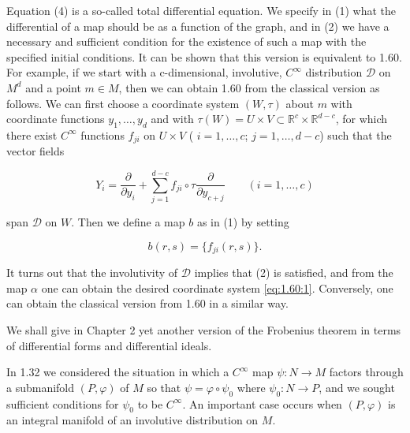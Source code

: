 \begin{remarks}
	Equation (4) is a so-called total differential equation. We specify in (1) what the differential of a map should be as a function of the graph, and in (2) we have a necessary and sufficient condition for the existence of such a map with the specified initial conditions. It can be shown that this version is equivalent to 1.60. For example, if we start with a c-dimensional, involutive,  $ C^\infty $ distribution  $ \mathcal{D} $ on  $ M^d $ and a point  $ m \in M $, then we can obtain 1.60 from the classical version as follows. We can first choose a coordinate system  $ (W, \tau) $ about  $ m $ with coordinate functions  $ y_1, \ldots, y_d $ and with  $\tau(W) = U \times V \subset \mathbb{R}^c \times \mathbb{R}^{d-c}$, for which there exist  $ C^\infty $ functions  $ f_{ji} $ on  $ U \times V $ ( $ i = 1, \ldots, c $;  $ j = 1, \ldots, d-c $) such that the vector fields

	\begin{equation}
		\tag{5}\label{eq:1.61:5}
		Y_{i}=\frac{\partial}{\partial y_{i}}+\sum_{j=1}^{d-c}f_{ji}\circ\tau\frac{\partial}{\partial y_{c+j}}\qquad(i=1,\ldots,c)
	\end{equation}

	span $\mathcal{D}$ on $W$. Then we define a map $b$ as in (1) by setting

	\begin{equation}
		\tag{6}\label{eq:1.61:6}
		b(r,s)=\{f_{j i}(r,s)\}.
	\end{equation}

	It turns out that the involutivity of $\mathcal{D}$ implies that (2) is satisfied, and from the map $\alpha$ one can obtain the desired coordinate system \eqref{eq:1.60:1}. Conversely, one can obtain the classical version from 1.60 in a similar way.

	We shall give in Chapter 2 yet another version of the Frobenius theorem in terms of differential forms and differential ideals.

	In 1.32 we considered the situation in which a $C^{\infty}$ map $\psi: N \to M$ factors through a submanifold $(P,\varphi)$ of $M$ so that $\psi = \varphi \circ \psi_{0}$ where $\psi_{0}: N \to P$, and we sought sufficient conditions for $\psi_{0}$ to be $C^{\infty}$. An important case occurs when $(P,\varphi)$ is an integral manifold of an involutive distribution on $M$.

\end{remarks}


